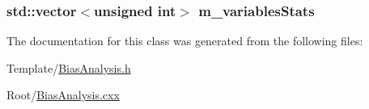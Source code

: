 \hypertarget{classBiasAnalysis_a3d7b92e9a8d64907accd1ddf0db3426a}{
\subsubsection[{m\+\_\+variables\+Stats}]{\setlength{\rightskip}{0pt plus 5cm}std\+::vector$<$unsigned int$>$ m\+\_\+variables\+Stats\hspace{0.3cm}{\ttfamily [private]}}}\label{classBiasAnalysis_a3d7b92e9a8d64907accd1ddf0db3426a}


The documentation for this class was generated from the following files\+:\begin{DoxyCompactItemize}
\item 
Template/\hyperlink{BiasAnalysis_8h}{Bias\+Analysis.\+h}\item 
Root/\hyperlink{BiasAnalysis_8cxx}{Bias\+Analysis.\+cxx}\end{DoxyCompactItemize}
